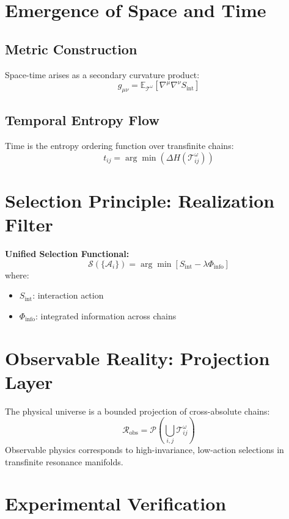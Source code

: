 \documentclass[11pt]{article}
\begin{document}
\section{Emergence of Space and Time}

\subsection{Metric Construction}

Space-time arises as a secondary curvature product:
\[
g_{\mu\nu} = \mathbb{E}_{\mathcal{T}^{\omega}} \left[ \nabla^\mu \nabla^\nu S_{\text{int}} \right]
\]

\subsection{Temporal Entropy Flow}

Time is the entropy ordering function over transfinite chains:
\[
t_{ij} = \arg \min \left( \Delta H(\mathcal{T}^{\omega}_{ij}) \right)
\]

\section{Selection Principle: Realization Filter}

\textbf{Unified Selection Functional:}
\[
\mathcal{S}(\{\mathcal{A}_i\}) = \arg\min \left[ S_{\text{int}} - \lambda \Phi_{\text{info}} \right]
\]
where:
\begin{itemize}[noitemsep]
    \item \(S_{\text{int}}\): interaction action
    \item \(\Phi_{\text{info}}\): integrated information across chains
\end{itemize}

\section{Observable Reality: Projection Layer}

The physical universe is a bounded projection of cross-absolute chains:
\[
\mathcal{R}_{\text{obs}} = \mathcal{P} \left( \bigcup_{i,j} \mathcal{T}^{\omega}_{ij} \right)
\]
Observable physics corresponds to high-invariance, low-action selections in transfinite resonance manifolds.

\section{Experimental Verification}
\end{document}
